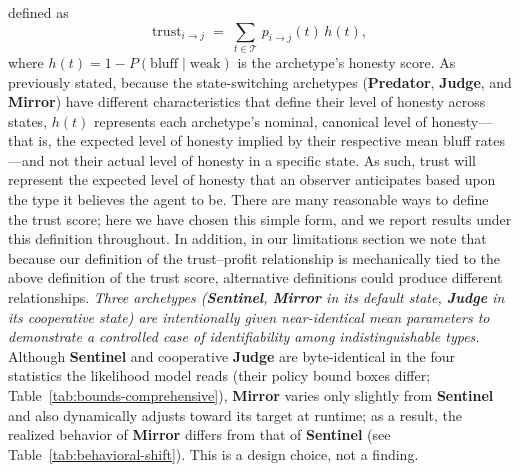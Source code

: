 \documentclass[10pt,twocolumn,letterpaper]{article}
\newcommand{\arch}[1]{\textbf{#1}}
\begin{document}
defined as
\begin{equation}
  \text{trust}_{i\to j} \;=\;
    \sum_{t\in\mathcal{T}}\, p_{i\to j}(t)\, h(t),
  \label{eq:trust}
\end{equation}
where $h(t) = 1 - P(\text{bluff}\mid\text{weak})$ is the
archetype's honesty
score. As previously stated, because the state-switching archetypes
(\arch{Predator}, \arch{Judge}, and \arch{Mirror}) have different
characteristics that define their level of honesty across states,
$h(t)$ represents each archetype's nominal, canonical level of
honesty---that is, the expected level of honesty implied by their
respective mean bluff rates---and not their actual level of honesty
in a specific state. As such, trust will represent the expected level
of honesty that an observer anticipates based upon the type it
believes the agent to be. There are many reasonable ways to define the trust score;
here we have chosen this simple form, and we report results under
this definition throughout. In addition, in our
limitations section we note that because our definition of the
trust--profit relationship is mechanically tied to the above
definition of the trust score, alternative definitions could
produce different relationships. \textit{Three archetypes
(\arch{Sentinel}, \arch{Mirror} in its default state, \arch{Judge}
in its cooperative state) are intentionally given near-identical mean
parameters to demonstrate a controlled case of identifiability among
indistinguishable types.} Although \arch{Sentinel} and cooperative \arch{Judge} are byte-identical
in the four statistics the likelihood model reads (their policy bound boxes
differ; Table~\ref{tab:bounds-comprehensive}), \arch{Mirror} varies only slightly from \arch{Sentinel} and also dynamically
adjusts toward its target at runtime; as a result, the realized
behavior of \arch{Mirror} differs from that of \arch{Sentinel}
(see Table~\ref{tab:behavioral-shift}).
This is a design choice, not a finding.
\end{document}
